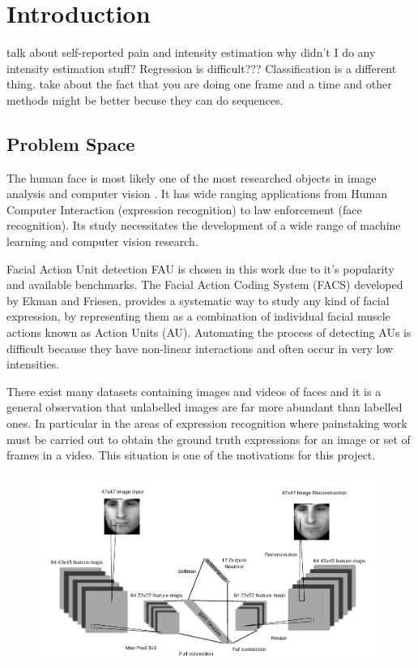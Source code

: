 \chapter{Introduction}
  talk about self-reported pain and intensity estimation
  why didn't I do any intensity estimation stuff?
  Regression is difficult??? Classification is a different thing.
  take about the fact that you are doing one frame and a time and
  other methods might be better becuse they can do sequences.
  \section{Problem Space}
    The human face is most likely one of the most researched objects in image analysis
    and computer vision \cite{S.ZafeiriouA.PapaioannouI.KotsiaM.A.Nicolaou}.
    It has wide ranging applications from Human
    Computer Interaction (expression recognition) to law enforcement (face recognition).
    Its study necessitates the development of a wide range of machine
    learning and computer vision research.

    Facial Action Unit detection FAU \cite{Corneanu2016} is chosen in this work due
    to it's popularity and available benchmarks.
    The Facial Action Coding System (FACS) developed by Ekman and Friesen,
    provides a systematic way to study any kind of facial expression,
    by representing them as a combination of individual facial muscle actions
    known as Action Units (AU). Automating the process of detecting AUs is difficult
    because they have non-linear interactions and often occur in very low intensities.

    There exist many datasets containing images and videos of faces and it is a general
    observation that unlabelled images are far more abundant than labelled ones.
    In particular in the areas of expression recognition where painstaking work
    must be carried out to obtain the ground truth expressions for an image or set of
    frames in a video. This situation is one of the motivations for this project.

    \begin{figure}
     \centering
     \includegraphics[width=\textwidth]{illustrations/aec_network.pdf}
    \end{figure}


